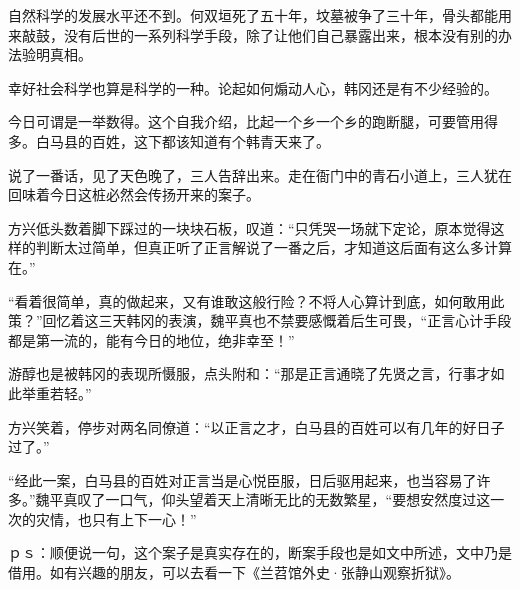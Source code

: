 自然科学的发展水平还不到。何双垣死了五十年，坟墓被争了三十年，骨头都能用来敲鼓，没有后世的一系列科学手段，除了让他们自己暴露出来，根本没有别的办法验明真相。

幸好社会科学也算是科学的一种。论起如何煽动人心，韩冈还是有不少经验的。

今日可谓是一举数得。这个自我介绍，比起一个乡一个乡的跑断腿，可要管用得多。白马县的百姓，这下都该知道有个韩青天来了。

说了一番话，见了天色晚了，三人告辞出来。走在衙门中的青石小道上，三人犹在回味着今日这桩必然会传扬开来的案子。

方兴低头数着脚下踩过的一块块石板，叹道：“只凭哭一场就下定论，原本觉得这样的判断太过简单，但真正听了正言解说了一番之后，才知道这后面有这么多计算在。”

“看着很简单，真的做起来，又有谁敢这般行险？不将人心算计到底，如何敢用此策？”回忆着这三天韩冈的表演，魏平真也不禁要感慨着后生可畏，“正言心计手段都是第一流的，能有今日的地位，绝非幸至！”

游醇也是被韩冈的表现所慑服，点头附和：“那是正言通晓了先贤之言，行事才如此举重若轻。”

方兴笑着，停步对两名同僚道：“以正言之才，白马县的百姓可以有几年的好日子过了。”

“经此一案，白马县的百姓对正言当是心悦臣服，日后驱用起来，也当容易了许多。”魏平真叹了一口气，仰头望着天上清晰无比的无数繁星，“要想安然度过这一次的灾情，也只有上下一心！”

ｐｓ：顺便说一句，这个案子是真实存在的，断案手段也是如文中所述，文中乃是借用。如有兴趣的朋友，可以去看一下《兰苕馆外史·张静山观察折狱》。

